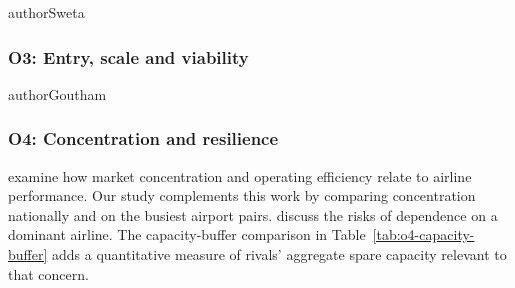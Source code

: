 \begin{mergedcontribution}{authorSweta}
\subsubsection{O3: Entry, scale and viability}

\end{mergedcontribution}

\begin{mergedcontribution}{authorGoutham}
\subsubsection{O4: Concentration and resilience}
\textcite{kumari2026soaring} examine how market concentration and operating efficiency relate to airline performance. Our study complements this work by comparing concentration nationally and on the busiest airport pairs. \textcite{gupta2025antitrust} discuss the risks of dependence on a dominant airline. The capacity-buffer comparison in Table~\ref{tab:o4-capacity-buffer} adds a quantitative measure of rivals' aggregate spare capacity relevant to that concern.
\end{mergedcontribution}
